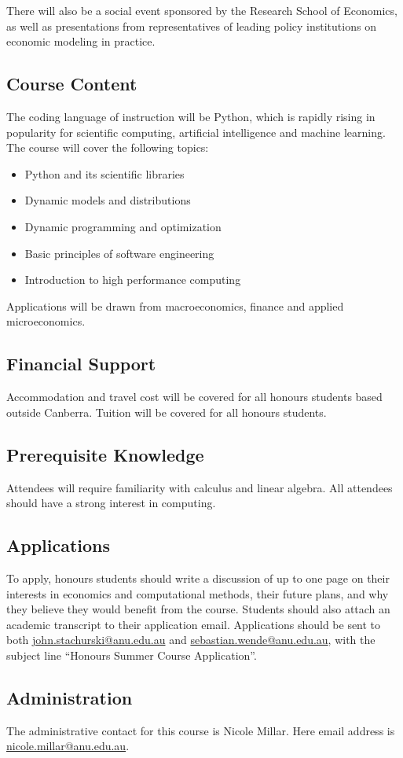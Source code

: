 \documentclass[12pt]{article}
\numberwithin{equation}{section}		%
\numberwithin{table}{section}				%
\begin{document}
There will also be a social event sponsored by the Research School of
Economics, as well as presentations from representatives of leading policy
institutions on economic modeling in practice.


\subsection*{Course Content}

The coding language of instruction will be Python, which is rapidly rising
in popularity for scientific computing, artificial intelligence and machine
learning.  The course will cover the following topics:

\begin{itemize}
    \item Python and its scientific libraries
    \item Dynamic models and distributions
    \item Dynamic programming and optimization
    \item Basic principles of software engineering
    \item Introduction to high performance computing
\end{itemize}

Applications will be drawn from macroeconomics, finance and applied
microeconomics.

\subsection*{Financial Support}

Accommodation and travel cost will be covered for all honours students based 
outside Canberra.  Tuition will be covered for all honours students.

\subsection*{Prerequisite Knowledge}

Attendees will require familiarity with calculus and linear algebra.
All attendees should have a strong interest in computing.

\subsection*{Applications}

To apply, honours students should write a discussion of up to one page on
their interests in economics and computational methods, their future plans,
and why they
believe they would benefit from the course.    Students should also attach an
academic transcript to their application email.  Applications should be sent
to both \href{mailto:john.stachurski@anu.edu.au}{john.stachurski@anu.edu.au} and
\href{mailto:sebastian.wende@anu.edu.au}{sebastian.wende@anu.edu.au}, with the
subject line ``Honours Summer Course Application''.


\subsection*{Administration}

The administrative contact for this course is Nicole Millar.  
Here email address is \href{mailto:nicole.millar@anu.edu.au}{nicole.millar@anu.edu.au}.




\end{document}
